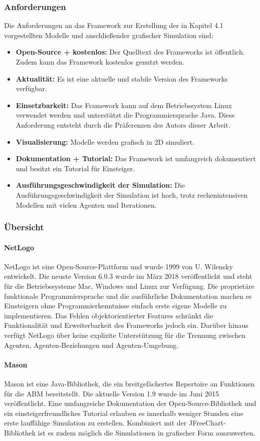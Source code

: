 \documentclass[a4paper, 11pt]{article}
\begin{document}
\subsubsection{Anforderungen}
Die Anforderungen an das Framework zur Erstellung der in Kapitel 4.1 vorgestellten Modelle und anschließender grafischer Simulation sind:
\begin{itemize}
	\item \textbf{Open-Source + kostenlos:} Der Quelltext des Frameworks ist öffentlich. Zudem kann das Framework kostenlos genutzt werden.
	\item \textbf{Aktualität:} Es ist eine aktuelle und stabile Version des Frameworks verfügbar. 
	\item \textbf{Einsetzbarkeit:} Das Framework kann auf dem Betriebssystem Linux verwendet werden und unterstützt die Programmiersprache Java. Diese Anforderung entsteht durch die Präferenzen des Autors dieser Arbeit.
	\item \textbf{Visualisierung:} Modelle werden grafisch in 2D simuliert.
	\item \textbf{Dokumentation + Tutorial:} Das Framework ist umfangreich dokumentiert und besitzt ein Tutorial für Einsteiger.
	\item \textbf{Ausführungsgeschwindigkeit der Simulation:} Die Ausführungsgeschwindigkeit der Simulation ist hoch, trotz rechenintensiven Modellen mit vielen Agenten und Iterationen.
\end{itemize}
\subsubsection{Übersicht}
\paragraph{NetLogo}
NetLogo ist eine Open-Source-Plattform und wurde 1999 von U. Wilensky entwickelt. Die neuste Version 6.0.3 wurde im März 2018 veröffentlicht und steht für die Betriebssysteme Mac, Windows und Linux zur Verfügung. Die proprietäre funktionale Programmiersprache und die ausführliche Dokumentation machen es Einsteigern ohne Programmierkenntnisse einfach erste eigene Modelle zu implementieren. Das Fehlen objektorientierter Features schränkt die Funktionalität und Erweiterbarkeit des Frameworks jedoch ein. Darüber hinaus verfügt NetLogo über keine explizite Unterstützung für die Trennung zwischen Agenten, Agenten-Beziehungen und Agenten-Umgebung.
\paragraph{Mason}
Mason ist eine Java-Bibliothek, die ein breitgefächertes Repertoire an Funktionen für die \acs{ABM} bereitstellt. Die aktuelle Version 1.9 wurde im Juni 2015 veröffentlicht. Eine umfangreiche Dokumentation der Open-Source-Bibliothek und ein einsteigerfreundliches Tutorial erlauben es innerhalb weniger Stunden eine erste lauffähige Simulation zu erstellen. Kombiniert mit der JFreeChart-Bibliothek ist es zudem möglich die Simulationen in grafischer Form auszuwerten.
\end{document}
